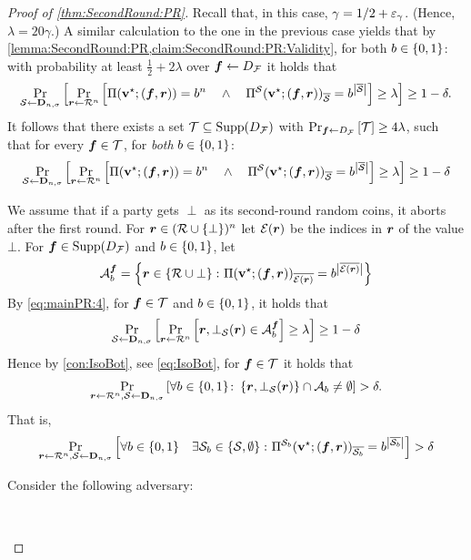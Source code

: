 \begin{proof}[Proof of \cref{thm:SecondRound:PR}]
Recall that, in this case, $\gamma=1/2+\eps_\gamma$. (Hence, $\lambda=20\gamma$.)
A similar calculation to the one in the previous case
yields that by \cref{lemma:SecondRound:PR,claim:SecondRound:PR:Validity}, for both $\o\in \zo$: with probability at least $\frac12 + 2\lambda$ over $\vf \gets \DF $ it holds that
\begin{align*}
\ppr{\cs \gets \bns}{\ppr{\vr \gets \rn}{\Pi(\vstar;(\vf,\vr)) = \o^n \qand \Pi^\cs(\vstar;(\vf,\vr))_\oS = \o^{\size{\oS}} } \ge \lambda}\ge 1-\delta.
\end{align*}
It follows that there exists a set $\cT \subseteq \SDF$ with $\ppr{\vf \gets \DF}{\cT}\ge 4\lambda$, such that for every $\vf\in \cT$, for \emph{both} $\o\in \zo$:
\begin{align}\label{eq:mainPR:4}
\ppr{\cs \gets \bns}{\ppr{\vr \gets \rn}{\Pi(\vstar;(\vf,\vr)) = \o^n \qand \Pi^\cs(\vstar;(\vf,\vr))_\oS = \o^{\size{\oS}} } \ge \lambda}\ge 1-\delta
\end{align}

We assume \wlg that if a party gets $\perp$ as its second-round random coins, it aborts after the first round. For $\vr \in (\cR\cup\sset{\bot})^n$ let $ \cE(\vr)$ be the indices in $\vr$ of the value $\bot$.
For $\vf \in \SDF$ and $\o \in \zo$, let
\begin{align}
\cA^\vf_\o = \set{\vr \in \rbot \colon \Pi(\vstar;(\vf,\vr))_{\overline{\cE(\vr)}} = \o^{\size{\overline{\cE(\vr)}}}}
\end{align}
By \cref{eq:mainPR:4}, for $\vf \in \cT$ and $\o\in \zo$, it holds that
\begin{align}
\ppr{\cs\gets \bns}{\ppr{\vr \gets \rn}{\vr,\bot_{\cS}(\vr) \in \cA^\vf_\o} \ge\lambda} \ge 1-\delta
\end{align}
Hence by \cref{con:IsoBot}, see \cref{eq:IsoBot}, for $\vf \in \cT$ it holds that
\begin{align*}
\ppr{\vr\gets \rn,\cS \gets \bns}{\forall \o \in \zo\colon \set{\vr,\bot_{\cS}(\vr)}\cap \cA_b \neq \emptyset} > \delta.
\end{align*}
That is,
\begin{align}\label{eq:PR:3}
\ppr{\vr\gets \cR^n,\cS \gets \bns}{\forall \o\in \zo \quad \exists \cs_\o \in \set{\cs,\emptyset} \colon \Pi^{\cS_\o}(\vstar;(\vf,\vr))_{\overline{\cS_\o}}= \o^{ \size{\overline{\cS_\o}}}} >\delta
\end{align}

{\samepage
	\noindent
	Consider the following adversary:
	
	\begin{algorithm}[$\Ac$]~
		

\end{algorithm}}
\end{proof}
